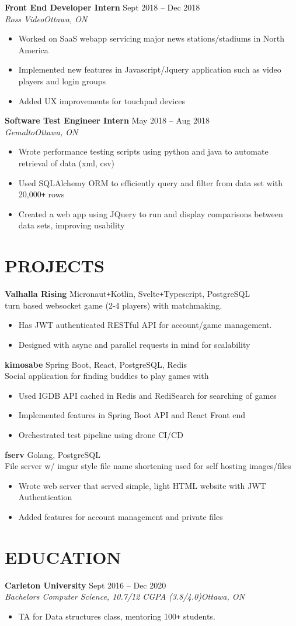 \documentclass[letterpaper]{article}
\newcommand{\NewPart}[1]{\section*{\uppercase{\large\textbf{#1}}}}
\newcommand{\DatedEntry}[5]{\textbf{#1}
	\hfill \small#2\\
	\textit{#3}\hfill\textit{#4}\\\vspace{0.1cm}
	#5\vspace{0.1cm}
}
\newcommand{\ProjectEntry}[4]{\textbf{#1}
	\hfill \small{#2}\\
	#3\\\vspace{0.1cm}
	#4\vspace{0.1cm}
}
\begin{document}
\DatedEntry{Front End Developer Intern}
{Sept 2018 -- Dec 2018}
{Ross Video}
{Ottawa, ON}
{\begin{itemize}[nolistsep]
	\item Worked on SaaS webapp servicing major news stations/stadiums in North America
	\item Implemented new features in Javascript/Jquery application such as video players and login groups
	\item Added UX improvements for touchpad devices
\end{itemize}}
\DatedEntry{Software Test Engineer Intern}
{May 2018 -- Aug 2018}
{Gemalto}
{Ottawa, ON}
{\begin{itemize}[nolistsep]
	\item Wrote performance testing scripts using python and java to automate retrieval of data (xml, csv)
	\item Used SQLAlchemy ORM to efficiently query and filter from data set with 20,000\texttt{+} rows
	\item Created a web app using JQuery to run and display comparisons between data sets, improving usability
\end{itemize}}\vspace{-0.3cm}

\NewPart{Projects}{}
\ProjectEntry{Valhalla Rising}
{Micronaut\texttt{+}Kotlin, Svelte\texttt{+}Typescript, PostgreSQL}
{turn based websocket game (2-4 players) with matchmaking.}
{\begin{itemize}
	\item Has JWT authenticated RESTful API for account/game management.
	\item Designed with async and parallel requests in mind for scalability
\end{itemize}}
\ProjectEntry{kimosabe}
{Spring Boot, React, PostgreSQL, Redis}
{Social application for finding buddies to play games with}
{\begin{itemize}
	\item Used IGDB API cached in Redis and RediSearch for searching of games
	\item Implemented features in Spring Boot API and React Front end
	\item Orchestrated test pipeline using drone CI/CD
\end{itemize}}
\ProjectEntry{fserv}
{Golang, PostgreSQL}
{File server w/ imgur style file name shortening used for self hosting images/files}
{\begin{itemize}
	\item Wrote web server that served simple, light HTML website with JWT Authentication
	\item Added features for account management and private files
\end{itemize}}\vspace{-0.3cm}

\NewPart{Education}{}
\DatedEntry{Carleton University}
{Sept 2016 -- Dec 2020}
{Bachelors Computer Science, 10.7/12 CGPA (3.8/4.0)}
{Ottawa, ON}
{\begin{itemize}
	\item TA for Data structures class, mentoring 100\texttt{+} students.
\end{itemize}}
\end{document}
